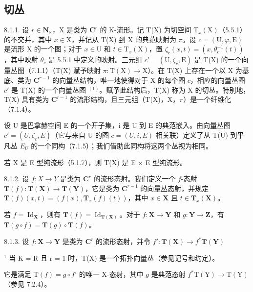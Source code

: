 \subsection{切丛}

8.1.1. 设 \(r \in \mathbf{N}_{\mathbb{K}}\)，X 是类为 \(\mathbf{C}^r\) 的 K-流形。记 T(X) 为切空间 \(\mathrm{T}_x(\mathrm{X})\)（5.5.1）的不交并，其中 \(x \in \mathrm{X}\)，并记从 T(X) 到 X 的典范映射为 \(\pi\)。设 \(c = (\mathrm{U}, \varphi, \mathrm{E})\) 是流形 X 的一个图；对于 \(x \in \mathrm{U}\) 和 \(t \in \mathrm{T}_x(\mathrm{X})\)，置 \(\zeta_c(x, t) = (x, \theta_c^{-1}(t))\)，其中映射 \(\theta_c\) 是 5.5.1 中定义的映射。三元组 \(c' = (\mathrm{U}, \zeta_c, \mathrm{E})\) 是 T(X) 的一个向量丛图（7.1.1）（T(X) 赋予映射 \(\pi: \mathrm{T}(\mathrm{X}) \to \mathrm{X}\)）。在 T(X) 上存在一个以 X 为基底、类为 \(\mathbf{C}^{r-1}\) 的向量丛结构，唯一地使得对于 X 的每个图 \(c\)，相应的向量丛图 \(c'\) 是 T(X) 的一个向量丛图 \(^{(1)}\)。赋予此结构后，T(X) 称为 X 的切丛。特别地，T(X) 具有类为 \(\mathbf{C}^{r-1}\) 的流形结构，且三元组（T(X)，X，\(\pi\)）是一个纤维化（7.1.4）。

设 U 是巴拿赫空间 E 的一个开子集，i 是 U 到 E 的典范嵌入。由向量丛图 \(c' = (U, \zeta_c, E)\)（它与来自 U 的图 \(c = (U, i, E)\) 相关联）定义了从 T(U) 到平凡丛 \(E_U\) 的一个同构（7.1.5）；我们借助此同构将这两个丛视为相同。

若 X 是 E 型纯流形（5.1.7），则 T(X) 是 E \(\times\) E 型纯流形。

8.1.2. 设 \(f: X \to Y\) 是类为 \(\mathbf{C}^r\) 的流形态射。我们定义一个 \(f\)-态射 \(\mathbf{T}(f): \mathbf{T}(\mathbf{X}) \to \mathbf{T}(\mathbf{Y})\)，它是类为 \(\mathbf{C}^{r-1}\) 的向量丛态射，并规定 \(\mathbf{T}(f)(x, t) = (f(x), \mathbf{T}_x(f)(t))\)，其中 \(x \in \mathbf{X}\) 且 \(t \in \mathbf{T}_x(\mathbf{X})\)。

若 \(f = \operatorname{Id}_{\mathbf{X}}\)，则有 \(\mathbf{T}(f) = \operatorname{Id}_{\mathbf{T}(\mathbf{X})}\)。对于 \(f: \mathbf{X} \to \mathbf{Y}\) 和 \(g: \mathbf{Y} \to \mathbf{Z}\)，有 \(\mathbf{T}(g \circ f) = \mathbf{T}(g) \circ \mathbf{T}(f)\)。

8.1.3. 设 \(f: \mathbf{X} \to \mathbf{Y}\) 是类为 \(\mathbf{C}^r\) 的流形态射，并令 \(f': \mathbf{T}(\mathbf{X}) \to f^* \mathbf{T}(\mathbf{Y})\)

\(^{1}\) 当 K = R 且 r = 1 时，T(X) 是一个拓扑向量丛（参见记号和约定）。

它是满足 \(\mathrm{T}(f) = g \circ f'\) 的唯一 X-态射，其中 \(g\) 是典范态射 \(f^{*}\mathrm{T}(\mathrm{Y}) \to \mathrm{T}(\mathrm{Y})\)（参见 7.2.4）。

